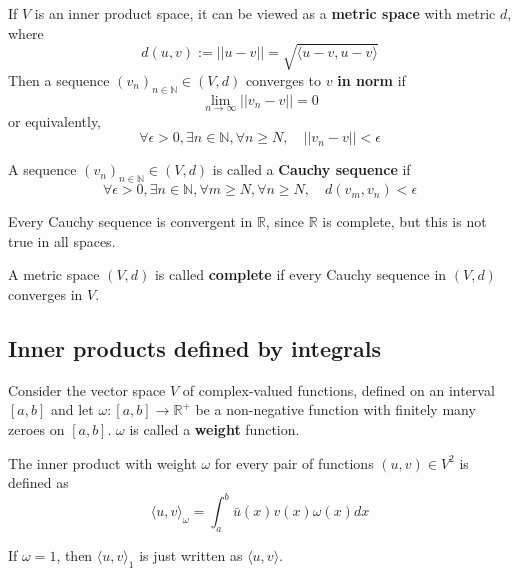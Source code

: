 \begin{definition}
	If $V$ is an inner product space, it can be viewed as a \textbf{metric space} with metric $d$, where
	\[
		d(u, v) := ||u - v|| = \sqrt{\langle u - v, u - v \rangle}
	\]
	Then a sequence ${(v_n)}_{n \in \mathbb{N}} \in (V, d)$ converges to $v$ \textbf{in norm} if
	\[
		\lim_{n \rightarrow \infty} ||v_n - v|| = 0
	\]
	or equivalently,
	\[
		\forall \epsilon > 0, \exists n \in \mathbb{N}, \forall n \ge N, \quad ||v_n - v|| < \epsilon
	\]
\end{definition}

\begin{definition}
	A sequence ${(v_n)}_{n \in \mathbb{N}} \in (V, d)$ is called a \textbf{Cauchy sequence} if
	\[
		\forall \epsilon > 0, \exists n \in \mathbb{N}, \forall m \ge N, \forall n \ge N, \quad d(v_m, v_n) < \epsilon
	\]
\end{definition}

\begin{remark}
	Every Cauchy sequence is convergent in $\mathbb{R}$, since $\mathbb{R}$ is complete, but this is not true in all spaces.
\end{remark}

\begin{definition}
	A metric space $(V, d)$ is called \textbf{complete} if every Cauchy sequence in $(V, d)$ converges in $V$.
\end{definition}

\subsection{Inner products defined by integrals}

\begin{definition}
	Consider the vector space $V$ of complex-valued functions, defined on an interval $[a, b]$ and let $\omega: [a, b] \rightarrow \mathbb{R}^+$ be a non-negative function with finitely many zeroes on $[a, b]$. $\omega$ is called a \textbf{weight} function.

	The inner product with weight $\omega$ for every pair of functions $(u, v) \in V^2$ is defined as
	\[
		{\langle u, v \rangle}_{\omega} = \int_{a}^{b} \bar{u}(x) v(x) \omega(x) dx
	\]
\end{definition}

\begin{remark}
	If $\omega = 1$, then ${\langle u, v \rangle}_1$ is just written as $\langle u, v \rangle$.
\end{remark}

